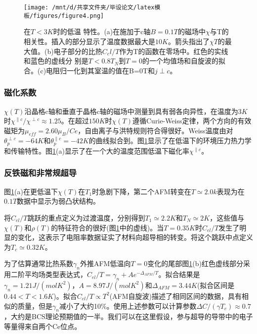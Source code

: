\begin{figure}[h]
    \centering
    \texttt{[image: /mnt/d/共享文件夹/毕设论文/latex模板/figures/figure4.png]}
    \caption{在$T < 3K$时的低温 特性。(a)在施加于c轴$B = 0.1T$的磁场中$\chi$与T的相关性。插入的部分显示了温度数据最大是$10K$。箭头指出了$\chi T$的最大值。(b)电子部分的比热$C_el/T$作为T的函数在零场中。红色的实线和蓝色的虚线分 别是$T < 0.8T_N$到$T = 0$的一个均值场和自旋波的拟合。(c)电阻归一化到其室温的值在B=0T和$j\perp c$\cite{8}。}
    \label{fig2}
\end{figure}

\subsubsection{磁化系数}
$\chi(T)$沿晶格c轴和垂直于晶格c轴的磁场中测量到具有弱各向异性，在温度为$3K$时$\chi^{\parallel c}/\chi^{\perp c} \approx 1.25$。在超过$150K$时$\chi(T)$遵循Curie-Weiss定律，两个方向的有效磁矩为$\mu_{eff}=2.60\mu_B /Ce$，自由离子与洪特规则符合得很好。Weiss温度由对$\theta^{\perp c}_{p}=-64K$和$\theta^{\parallel c}_p=-42K$的曲线拟合到。图\ref{fig2}显示了在低温下的环境压力热力学和传输特性。图\ref{fig2}(a)显示了在一个大的温度范围低温下磁化率$\chi^{\parallel c}$。

\subsubsection{反铁磁和非常规超导}
图\ref{fig2}(a)在更低温下$\chi(T)$在$T_1$时急剧下降，第二个AFM转变在$T \simeq 2.0k$表现为在$0.1T$数据中显示为弱凸状结构。

将$C_{el}/T$跳跃的重点定义为过渡温度，分别得到$T_1 \simeq 2.2K$和$T_N \simeq 2K$，这些值与$\chi(T)$和$\rho(T)$的特征符合的很好(图\ref{fig2}中的虚线)。当$T=0.35K$时$C_{el}/T$发生了明显的变化，这表示了电阻率数据证实了材料向超导相的转变。将这个跳跃中点定义为$T_c \simeq 0.32K$。

为了估算通常比热系数$\gamma_n$外推AFM低温向$T=0$变化的尾部图\ref{fig2}(b)红色虚线部分采用二阶平均场类型表达式，$C_{el}/T=\gamma_n + A e^{-\Delta_{AFM}/T}$。拟合结果是$\gamma_n=1.21J/(molK^2)$，$A=8.97J/(molK^2)$和$\Delta_{AFM}=3.44K$(拟合区间是$0.44<T<1.6K$)。拟合$C_{el}/T \propto T^2$(AFM自旋波)描述了相同区间的数据，具有相似的质量，但是$\gamma_n$减小了大约10\%。使用上述参数可以计算参数$\Delta C/(\gamma T_c)\approx 0.7$，大约是BCS理论预期值的一半。我们可以在这里假设，参与超导的导带中的电子等量得来自两个Ce位点。







